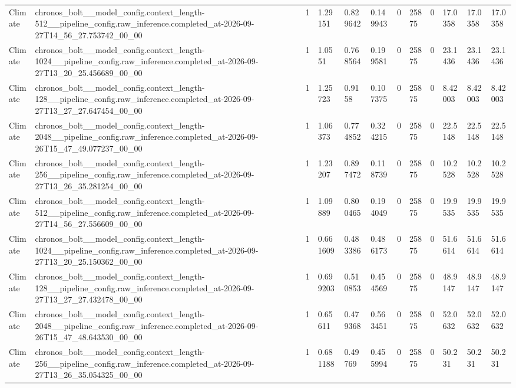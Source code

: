 \begin{tabular}{llllllllllll}
Climate & chronos\_bolt\_\_model\_config.context\_length-512\_\_pipeline\_config.raw\_inference.completed\_at-2026-09-27T14\_56\_27.753742\_00\_00 & 1 & 1.29151 & 0.829642 & 0.149943 & 0 & 25875 & 0 & 17.0358 & 17.0358 & 17.0358 \\
Climate & chronos\_bolt\_\_model\_config.context\_length-1024\_\_pipeline\_config.raw\_inference.completed\_at-2026-09-27T13\_20\_25.456689\_00\_00 & 1 & 1.0551 & 0.768564 & 0.199581 & 0 & 25875 & 0 & 23.1436 & 23.1436 & 23.1436 \\
Climate & chronos\_bolt\_\_model\_config.context\_length-128\_\_pipeline\_config.raw\_inference.completed\_at-2026-09-27T13\_27\_27.647454\_00\_00 & 1 & 1.25723 & 0.9158 & 0.107375 & 0 & 25875 & 0 & 8.42003 & 8.42003 & 8.42003 \\
Climate & chronos\_bolt\_\_model\_config.context\_length-2048\_\_pipeline\_config.raw\_inference.completed\_at-2026-09-26T15\_47\_49.077237\_00\_00 & 1 & 1.06373 & 0.774852 & 0.324215 & 0 & 25875 & 0 & 22.5148 & 22.5148 & 22.5148 \\
Climate & chronos\_bolt\_\_model\_config.context\_length-256\_\_pipeline\_config.raw\_inference.completed\_at-2026-09-27T13\_26\_35.281254\_00\_00 & 1 & 1.23207 & 0.897472 & 0.118739 & 0 & 25875 & 0 & 10.2528 & 10.2528 & 10.2528 \\
Climate & chronos\_bolt\_\_model\_config.context\_length-512\_\_pipeline\_config.raw\_inference.completed\_at-2026-09-27T14\_56\_27.556609\_00\_00 & 1 & 1.09889 & 0.800465 & 0.194049 & 0 & 25875 & 0 & 19.9535 & 19.9535 & 19.9535 \\
Climate & chronos\_bolt\_\_model\_config.context\_length-1024\_\_pipeline\_config.raw\_inference.completed\_at-2026-09-27T13\_20\_25.150362\_00\_00 & 1 & 0.661609 & 0.483386 & 0.486173 & 0 & 25875 & 0 & 51.6614 & 51.6614 & 51.6614 \\
Climate & chronos\_bolt\_\_model\_config.context\_length-128\_\_pipeline\_config.raw\_inference.completed\_at-2026-09-27T13\_27\_27.432478\_00\_00 & 1 & 0.699203 & 0.510853 & 0.454569 & 0 & 25875 & 0 & 48.9147 & 48.9147 & 48.9147 \\
Climate & chronos\_bolt\_\_model\_config.context\_length-2048\_\_pipeline\_config.raw\_inference.completed\_at-2026-09-26T15\_47\_48.643530\_00\_00 & 1 & 0.65611 & 0.479368 & 0.563451 & 0 & 25875 & 0 & 52.0632 & 52.0632 & 52.0632 \\
Climate & chronos\_bolt\_\_model\_config.context\_length-256\_\_pipeline\_config.raw\_inference.completed\_at-2026-09-27T13\_26\_35.054325\_00\_00 & 1 & 0.681188 & 0.49769 & 0.455994 & 0 & 25875 & 0 & 50.231 & 50.231 & 50.231 \\

\end{tabular}
